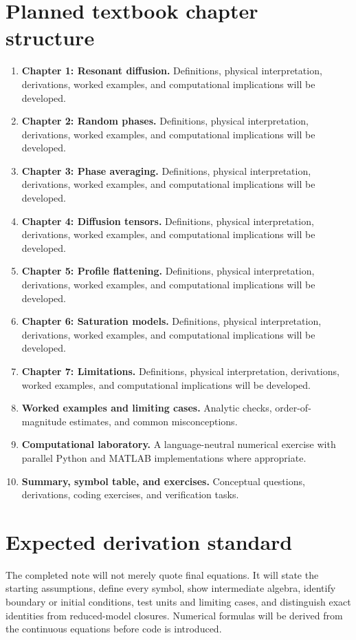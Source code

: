 \documentclass[11pt]{article}
\begin{document}
\section{Planned textbook chapter structure}
\begin{enumerate}[leftmargin=1.8em]
\item \textbf{Chapter 1: Resonant diffusion.} Definitions, physical interpretation, derivations, worked examples, and computational implications will be developed.
\item \textbf{Chapter 2: Random phases.} Definitions, physical interpretation, derivations, worked examples, and computational implications will be developed.
\item \textbf{Chapter 3: Phase averaging.} Definitions, physical interpretation, derivations, worked examples, and computational implications will be developed.
\item \textbf{Chapter 4: Diffusion tensors.} Definitions, physical interpretation, derivations, worked examples, and computational implications will be developed.
\item \textbf{Chapter 5: Profile flattening.} Definitions, physical interpretation, derivations, worked examples, and computational implications will be developed.
\item \textbf{Chapter 6: Saturation models.} Definitions, physical interpretation, derivations, worked examples, and computational implications will be developed.
\item \textbf{Chapter 7: Limitations.} Definitions, physical interpretation, derivations, worked examples, and computational implications will be developed.
\item \textbf{Worked examples and limiting cases.} Analytic checks, order-of-magnitude estimates, and common misconceptions.
\item \textbf{Computational laboratory.} A language-neutral numerical exercise with parallel Python and MATLAB implementations where appropriate.
\item \textbf{Summary, symbol table, and exercises.} Conceptual questions, derivations, coding exercises, and verification tasks.
\end{enumerate}

\section{Expected derivation standard}
The completed note will not merely quote final equations. It will state the starting assumptions, define every symbol, show intermediate algebra, identify boundary or initial conditions, test units and limiting cases, and distinguish exact identities from reduced-model closures. Numerical formulas will be derived from the continuous equations before code is introduced.
\end{document}
